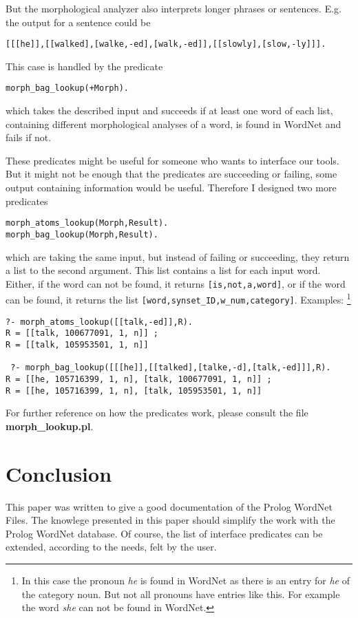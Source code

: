 \documentclass[12pt]{article}
\begin{document}
But the morphological analyzer also interprets longer phrases or sentences. E.g. the output for
a sentence could be
\begin{verbatim}
[[[he]],[[walked],[walke,-ed],[walk,-ed]],[[slowly],[slow,-ly]]].
\end{verbatim}
This case is handled by the predicate
\begin{verbatim}
morph_bag_lookup(+Morph).
\end{verbatim}
which takes the described input and succeeds if at least one word of each list, containing different
morphological analyses of a word, is found in WordNet and fails if not.

These predicates might be useful for someone who wants to interface our
tools. But it might not be enough that the predicates are succeeding or failing, some output containing information
would be useful. Therefore I designed two more predicates
\begin{verbatim}
morph_atoms_lookup(Morph,Result).
morph_bag_lookup(Morph,Result).
\end{verbatim}
which are taking the same input, but instead of failing or succeeding, they return a list to the second argument.
This list contains a list for each input word. Either, if the word can not be found, it returns {\tt [is,not,a,word]}, or if the word
can be found, it returns the list {\tt [word,synset\_ID,w\_num,category]}.
\newpage
Examples:
\footnote{In this case the pronoun \emph{he} is found in WordNet as there is an entry for \emph{he}
of the category noun. But not all
pronouns have entries like this. For example the word \emph{she} can not be found in WordNet.}
\begin{verbatim}
?- morph_atoms_lookup([[talk,-ed]],R).
R = [[talk, 100677091, 1, n]] ;
R = [[talk, 105953501, 1, n]]

 ?- morph_bag_lookup([[[he]],[[talked],[talke,-d],[talk,-ed]]],R).
R = [[he, 105716399, 1, n], [talk, 100677091, 1, n]] ;
R = [[he, 105716399, 1, n], [talk, 105953501, 1, n]]
\end{verbatim}

For further reference on how the predicates work, please consult the file {\bfseries morph\_lookup.pl}.


\section{Conclusion}

This paper was written to give a good documentation of the Prolog WordNet Files. The knowlege presented in this
paper should simplify the work with the Prolog WordNet database. Of course, the list of interface predicates can be extended,
according to the needs, felt by the user.
\end{document}
